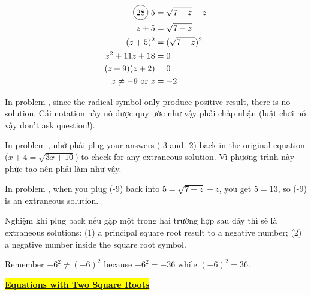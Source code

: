 \begin{multicols}{2}
\begin{align*}
  \circled{28}\ 5&=\sqrt{7-z}-z\\
  z+5&=\sqrt{7-z}\\
  (z+5)^{2}&=(\sqrt{7-z})^{2}\\
  z^{2}+11z+18&=0\\
  (z+9)(z+2)&=0\\
  z\neq-9 \text{ or } z&=-2
\end{align*}
\end{multicols}

In problem , since the radical symbol only produce positive result, there is no solution. Cái notation này nó được quy ước như vậy phải chấp nhận (luật chơi nó vậy don't ask question!).

In problem , nhớ phải plug your answers (-3 and -2) back in the original equation ($x+4=\sqrt{3x+10}$) to check for any extraneous solution. Vì phương trình này phức tạo nên phải làm như vậy.

In problem , when you plug (-9) back into $5=\sqrt{7-z}-z$, you get $5=13$, so (-9) is an extraneous solution.

Nghiệm khi plug back nếu gặp một trong hai trường hợp sau đây thì sẽ là extraneous solutions: (1) a principal square root result to a negative number; (2) a negative number inside the square root symbol.

\vspace{.4cm}

Remember $-6^{2}\neq(-6)^{2}$ because $-6^{2}=-36$ while $(-6)^{2}=36$.

\vspace{.7cm}

\centerline{\colorbox{yellow}{\underline{\textbf{\large Equations with Two Square Roots}}}}

\vspace{.5cm}

